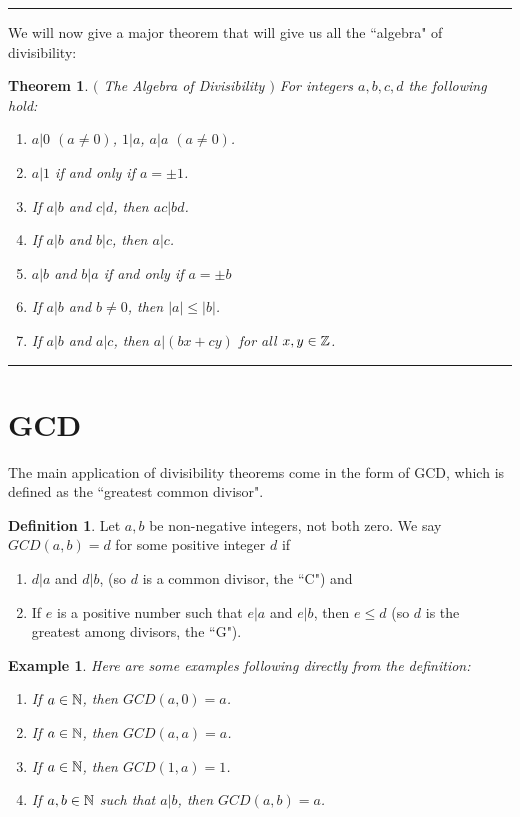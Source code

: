 \documentclass[12pt]{article}
\theoremstyle{plain}
\newtheorem{example}{Example}
\newtheorem{theorem}{Theorem}
\theoremstyle{definition}
\newtheorem{definition}{Definition}
\theoremstyle{remark}
\begin{document}
\bigskip
\hrule

\bigskip
\noindent
We will now give a major theorem that will give us all the ``algebra" of divisibility:

\begin{theorem} $($ The Algebra of Divisibility $)$
For integers $a, b, c, d$ the following hold:
\begin{enumerate}
    \item $a|0$ $(a\neq 0)$, $1|a$, $a|a$ $(a\neq 0)$.
    \item $a|1$ if and only if $a=\pm 1$.
    \item If $a|b$ and $c|d$, then $ac|bd$.
    \item If $a|b$ and $b|c$, then $a|c$. 
    \item $a|b$ and $b|a$ if and only if $a=\pm b$
    \item If $a|b$ and $b\neq 0$, then $|a|\leq |b|$. 
    \item If $a|b$ and $a|c$, then $a|(bx+cy)$ for all $x,y\in \mathbb{Z}$. 
\end{enumerate}
\end{theorem}

\bigskip
\hrule

\section{GCD}

The main application of divisibility theorems come in the form of GCD, which is defined as the ``greatest common divisor". 
\begin{definition}
Let $a, b$ be non-negative integers, not both zero. We say $GCD(a,b)=d$ for some positive integer $d$ if 
\begin{enumerate}
    \item $d|a$ and $d|b$, (so $d$ is a common divisor, the ``C") and
    \item If $e$ is a positive number such that $e|a$ and $e|b$, then $e\leq d$ (so $d$ is the greatest among divisors, the ``G").  
\end{enumerate}
\end{definition}

\begin{example} Here are some examples following directly from the definition:
\begin{enumerate}
    \item If $a\in \mathbb{N}$, then $GCD(a,0)=a$.
    \item If $a\in \mathbb{N}$, then $GCD(a,a)=a$.
    \item If $a\in \mathbb{N}$, then $GCD(1,a) =1$.
    \item If $a,b \in \mathbb{N}$ such that $a|b$, then $GCD(a,b)=a$. 
\end{enumerate}
\end{example}
\end{document}
